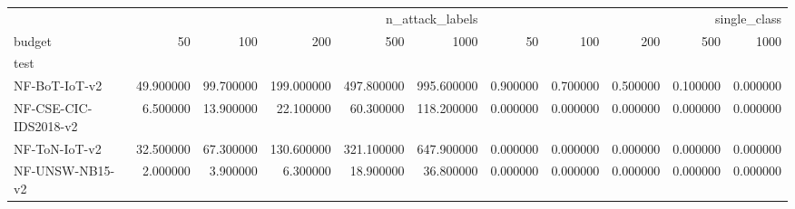 \begin{tabular}{lrrrrrrrrrr}
\toprule
 & \multicolumn{5}{r}{n_attack_labels} & \multicolumn{5}{r}{single_class} \\
budget & 50 & 100 & 200 & 500 & 1000 & 50 & 100 & 200 & 500 & 1000 \\
test &  &  &  &  &  &  &  &  &  &  \\
\midrule
NF-BoT-IoT-v2 & 49.900000 & 99.700000 & 199.000000 & 497.800000 & 995.600000 & 0.900000 & 0.700000 & 0.500000 & 0.100000 & 0.000000 \\
NF-CSE-CIC-IDS2018-v2 & 6.500000 & 13.900000 & 22.100000 & 60.300000 & 118.200000 & 0.000000 & 0.000000 & 0.000000 & 0.000000 & 0.000000 \\
NF-ToN-IoT-v2 & 32.500000 & 67.300000 & 130.600000 & 321.100000 & 647.900000 & 0.000000 & 0.000000 & 0.000000 & 0.000000 & 0.000000 \\
NF-UNSW-NB15-v2 & 2.000000 & 3.900000 & 6.300000 & 18.900000 & 36.800000 & 0.000000 & 0.000000 & 0.000000 & 0.000000 & 0.000000 \\
\bottomrule
\end{tabular}
